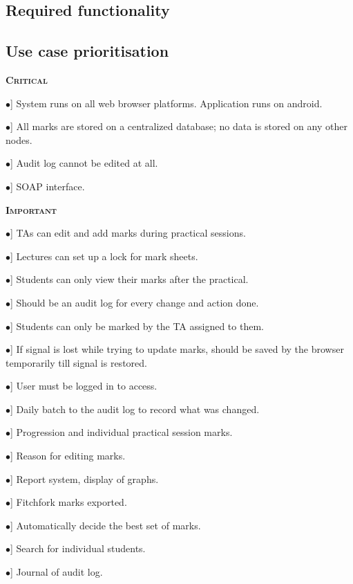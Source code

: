 \documentclass[12pt, a4paper]{scrartcl}
\newcommand{\tab}[1]{\hspace{.05\textwidth}\rlap{#1}}
\begin{document}
			\subsection{Required functionality}
			\subsection{Use case prioritisation}
				\textsc{\bf Critical}
				\begin{description}
					\item \tab [$\bullet$] System runs on all web browser platforms.
				Application runs on android.
					\item \tab [$\bullet$] All marks are stored on a centralized database; no data is stored on any other nodes.
					\item \tab [$\bullet$] Audit log cannot be edited at all.
					\item \tab [$\bullet$] SOAP interface.
				\end{description}
				\textsc{\bf Important}
				\begin{description}
					\item \tab [$\bullet$] TAs can edit and add marks during practical sessions.
					\item \tab [$\bullet$] Lectures can set up a lock for mark sheets.
					\item \tab [$\bullet$] Students can only view their marks after the practical.
					\item \tab [$\bullet$] Should be an audit log for every change and action done.
					\item \tab [$\bullet$] Students can only be marked by the TA assigned to them.
					\item \tab [$\bullet$] If signal is lost while trying to update marks, should be saved by the browser temporarily till signal is restored.
					\item \tab [$\bullet$] User must be logged in to access.
					\item \tab [$\bullet$] Daily batch to the audit log to record what was changed.
					\item \tab [$\bullet$] Progression and individual practical session marks.
					\item \tab [$\bullet$] Reason for editing marks.
					\item \tab [$\bullet$] Report system, display of graphs.
					\item \tab [$\bullet$] Fitchfork marks exported.
					\item \tab [$\bullet$] Automatically decide the best set of marks.
					\item \tab [$\bullet$] Search for individual students.
					\item \tab [$\bullet$] Journal of audit log.
				\end{description}
\end{document}
